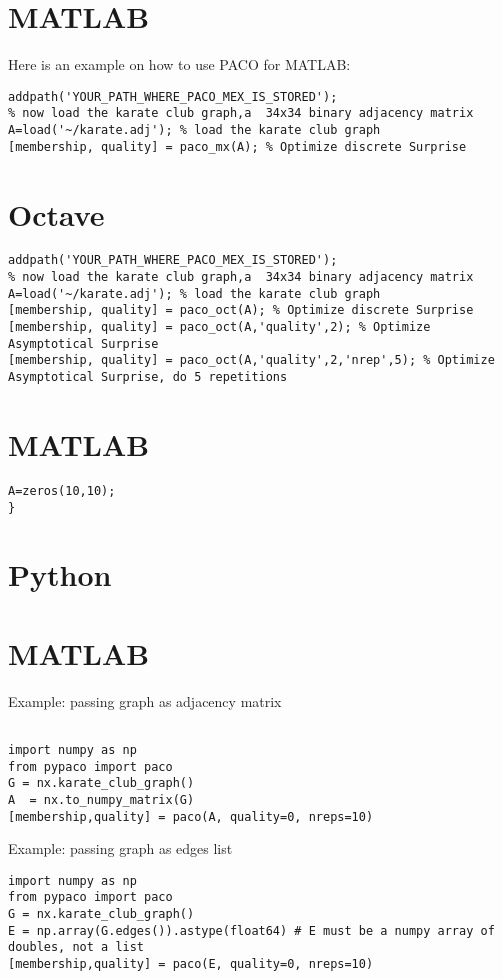 \documentclass[11pt,%
              a4paper,%
]{article}
\begin{document}
\section{MATLAB}
Here is an example on how to use PACO for MATLAB:

\begin{verbatim}
addpath('YOUR_PATH_WHERE_PACO_MEX_IS_STORED');
% now load the karate club graph,a  34x34 binary adjacency matrix
A=load('~/karate.adj'); % load the karate club graph
[membership, quality] = paco_mx(A); % Optimize discrete Surprise
\end{verbatim}


\section{Octave}
\begin{verbatim}
addpath('YOUR_PATH_WHERE_PACO_MEX_IS_STORED');
% now load the karate club graph,a  34x34 binary adjacency matrix
A=load('~/karate.adj'); % load the karate club graph
[membership, quality] = paco_oct(A); % Optimize discrete Surprise
[membership, quality] = paco_oct(A,'quality',2); % Optimize Asymptotical Surprise
[membership, quality] = paco_oct(A,'quality',2,'nrep',5); % Optimize Asymptotical Surprise, do 5 repetitions
\end{verbatim}


\section{MATLAB}
\begin{verbatim}
A=zeros(10,10);
}
\end{verbatim}
\section{Python}
\section{MATLAB}
Example: passing graph as adjacency matrix
\begin{verbatim}

import numpy as np
from pypaco import paco
G = nx.karate_club_graph()
A  = nx.to_numpy_matrix(G)
[membership,quality] = paco(A, quality=0, nreps=10)
\end{verbatim}  
Example: passing graph as edges list

\begin{verbatim}
import numpy as np
from pypaco import paco
G = nx.karate_club_graph()
E = np.array(G.edges()).astype(float64) # E must be a numpy array of doubles, not a list
[membership,quality] = paco(E, quality=0, nreps=10)
\end{verbatim}
\end{document}
